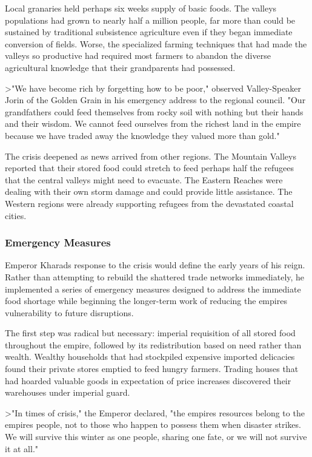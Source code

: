 Local granaries held perhaps six weeks\textquotesingle{} supply of basic
foods. The valleys\textquotesingle{} populations had grown to nearly
half a million people, far more than could be sustained by traditional
subsistence agriculture even if they began immediate conversion of
fields. Worse, the specialized farming techniques that had made the
valleys so productive had required most farmers to abandon the diverse
agricultural knowledge that their grandparents had possessed.

\textgreater"We have become rich by forgetting how to be poor," observed
Valley-Speaker Jorin of the Golden Grain in his emergency address to the
regional council. "Our grandfathers could feed themselves from rocky
soil with nothing but their hands and their wisdom. We cannot feed
ourselves from the richest land in the empire because we have traded
away the knowledge they valued more than gold."

The crisis deepened as news arrived from other regions. The Mountain
Valleys reported that their stored food could stretch to feed perhaps
half the refugees that the central valleys might need to evacuate. The
Eastern Reaches were dealing with their own storm damage and could
provide little assistance. The Western regions were already supporting
refugees from the devastated coastal cities.

\subsubsection{Emergency Measures}\label{emergency-measures}

Emperor Kharad\textquotesingle s response to the crisis would define the
early years of his reign. Rather than attempting to rebuild the
shattered trade networks immediately, he implemented a series of
emergency measures designed to address the immediate food shortage while
beginning the longer-term work of reducing the empire\textquotesingle s
vulnerability to future disruptions.

The first step was radical but necessary: imperial requisition of all
stored food throughout the empire, followed by its redistribution based
on need rather than wealth. Wealthy households that had stockpiled
expensive imported delicacies found their private stores emptied to feed
hungry farmers. Trading houses that had hoarded valuable goods in
expectation of price increases discovered their warehouses under
imperial guard.

\textgreater"In times of crisis," the Emperor declared, "the
empire\textquotesingle s resources belong to the
empire\textquotesingle s people, not to those who happen to possess them
when disaster strikes. We will survive this winter as one people,
sharing one fate, or we will not survive it at all."

